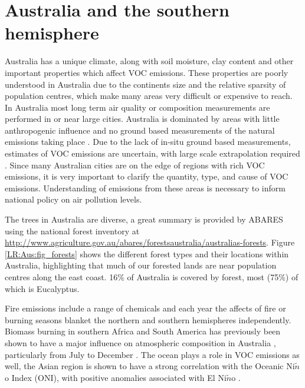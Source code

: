 \section{Australia and the southern hemisphere}
\label{LR:Aus}
  Australia has a unique climate, along with soil moisture, clay content and other important properties which affect VOC emissions.
  These properties are poorly understood in Australia due to the continents size and the relative sparsity of population centres, which make many areas very difficult or expensive to reach.
  In Australia most long term air quality or composition measurements are performed in or near large cities.
  Australia is dominated by areas with little anthropogenic influence and no ground based measurements of the natural emissions taking place \citep{VanDerA2008}.
  Due to the lack of in-situ ground based measurements, estimates of VOC emissions are uncertain, with large scale extrapolation required \cite{Millet2006}.
  Since many Australian cities are on the edge of regions with rich VOC emissions, it is very important to clarify the quantity, type, and cause of VOC emissions.
  Understanding of emissions from these areas is necessary to inform national policy on air pollution levels.
  
  The trees in Australia are diverse, a great summary is provided by ABARES using the national forest inventory at  \url{http://www.agriculture.gov.au/abares/forestsaustralia/australias-forests}.
  Figure \ref{LR:Aus:fig_forests} shows the different forest types and their locations within Australia, highlighting that much of our forested lands are near population centres along the east coast.
  16\% of Australia is covered by forest, most (75\%) of which is Eucalyptus.
  
  
  Fire emissions include a range of chemicals and each year the affects of fire or burning seasons blanket the northern and southern hemispheres independently.
  Biomass burning in southern Africa and South America has previously been shown to have a major influence on atmospheric composition in Australia \citep{Oltmans2001, Gloudemans2006, Edwards2006}, particularly from July to December \citep{Pak2003, Liu2016}.
  The ocean plays a role in VOC emissions as well, the Asian region is shown to have a strong correlation with the Oceanic Ni$\tilde{n}$o Index (ONI), with positive anomalies associated with El Ni$\tilde{n}$o \citep{Stavrakou2014}.
  
